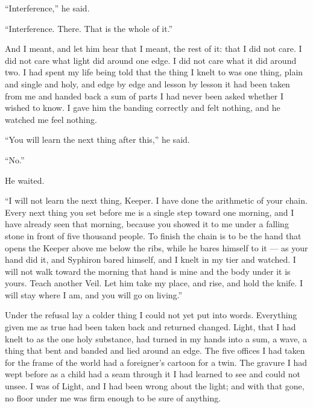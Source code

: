``Interference,'' he said.\par

``Interference. There. That is the whole of it.''\par

And I meant, and let him hear that I meant, the rest of it: that I did not care. I did not care what light did around one edge. I did not care what it did around two. I had spent my life being told that the thing I knelt to was one thing, plain and single and holy, and edge by edge and lesson by lesson it had been taken from me and handed back a sum of parts I had never been asked whether I wished to know. I gave him the banding correctly and felt nothing, and he watched me feel nothing.\par

``You will learn the next thing after this,'' he said.\par

``No.''\par

He waited.\par

``I will not learn the next thing, Keeper. I have done the arithmetic of your chain. Every next thing you set before me is a single step toward one morning, and I have already seen that morning, because you showed it to me under a falling stone in front of five thousand people. To finish the chain is to be the hand that opens the Keeper above me below the ribs, while he bares himself to it --- as your hand did it, and Syphiron bared himself, and I knelt in my tier and watched. I will not walk toward the morning that hand is mine and the body under it is yours. Teach another Veil. Let him take my place, and rise, and hold the knife. I will stay where I am, and you will go on living.''\par

Under the refusal lay a colder thing I could not yet put into words. Everything given me as true had been taken back and returned changed. Light, that I had knelt to as the one holy substance, had turned in my hands into a sum, a wave, a thing that bent and banded and lied around an edge. The five offices I had taken for the frame of the world had a foreigner's cartoon for a twin. The gravure I had wept before as a child had a seam through it I had learned to see and could not unsee. I was of Light, and I had been wrong about the light; and with that gone, no floor under me was firm enough to be sure of anything.\par

